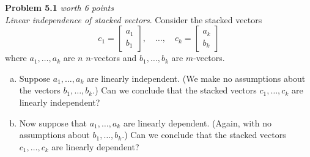 \documentclass{article}
\newenvironment{problem}[3][Problem]
    { \begin{mdframed}[backgroundcolor=gray!20] \textbf{#1 #2} \textit{worth #3 points} \\}
    {  \end{mdframed}}
\begin{document}
\begin{problem}{5.1}{6}
\textit{Linear independence of stacked vectors}. Consider the stacked vectors
$$c_1 = \begin{bmatrix} a_1 \\ b_1 \end{bmatrix}, \quad \ldots, \quad c_k = \begin{bmatrix} a_k \\ b_k \end{bmatrix}$$
where $a_1, \ldots, a_k$ are $n$ $n$-vectors and $b_1,\ldots,b_k$ are $m$-vectors.
\begin{enumerate}[(a)]
    \item Suppose $a_1, \ldots, a_k$ are linearly independent. (We make no assumptions about the vectors $b_1,\ldots,b_k$.) Can we conclude that the stacked vectors $c_1,\ldots,c_k$ are linearly independent?
    \item Now suppose that $a_1, \ldots, a_k$ are linearly dependent. (Again, with no assumptions about $b_1,\ldots,b_k$.) Can we conclude that the stacked vectors $c_1,\ldots,c_k$ are linearly dependent?
\end{enumerate}
\end{problem}
\end{document}
